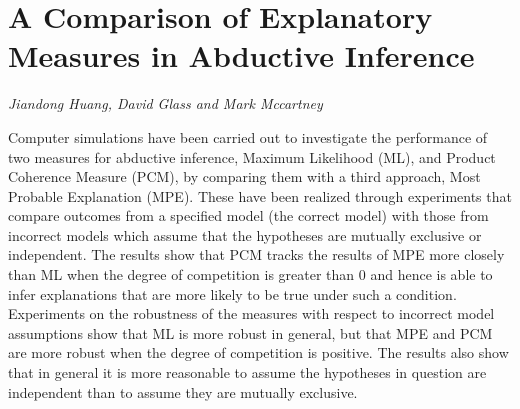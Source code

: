 \documentclass[../booklet.tex]{subfiles}
\begin{document}
\section[A Comparison of Explanatory Measures in Abductive Inference. {\it Jiandong Huang, David Glass and Mark Mccartney}]{A Comparison of Explanatory Measures in Abductive Inference}
  

\begin{center}
  {\it Jiandong Huang, David Glass and Mark Mccartney}
\end{center}

\vskip 0.8cm

Computer simulations have been carried out to investigate the performance of two measures for abductive inference, Maximum Likelihood (ML), and Product Coherence Measure (PCM), by comparing them with a third approach, Most Probable Explanation (MPE). These have been realized through experiments that compare outcomes from a specified model (the correct model) with those from incorrect models which assume that the hypotheses are mutually exclusive or independent. The results show that PCM tracks the results of MPE more closely than ML when the degree of competition is greater than 0 and hence is able to infer explanations that are more likely to be true under such a condition. Experiments on the robustness of the measures with respect to incorrect model assumptions show that ML is more robust in general, but that MPE and PCM are more robust when the degree of competition is positive.  The results also show that in general it is more reasonable to assume the hypotheses in question are independent than to assume they are mutually exclusive. 

\end{document}
